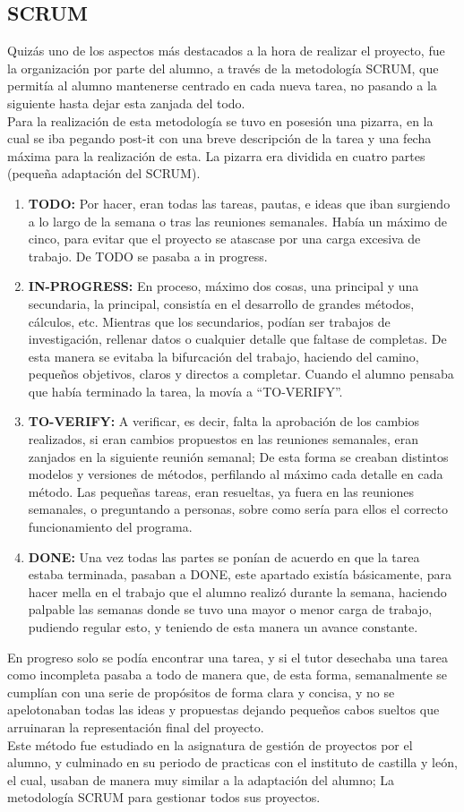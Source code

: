\subsection{SCRUM}
Quizás uno de los aspectos más destacados a la hora de realizar el proyecto, fue la organización por parte del alumno, a través de la metodología SCRUM, que permitía al alumno mantenerse centrado en cada nueva tarea, no pasando a la siguiente hasta dejar esta zanjada del todo. \\
Para la realización de esta metodología se tuvo en posesión una pizarra, en la cual se iba pegando post-it con una breve descripción de la tarea y una fecha máxima para la realización de esta. La pizarra era dividida en cuatro partes (pequeña adaptación del SCRUM).\\
\begin{enumerate}
\item	\textbf{TODO:}  Por hacer, eran todas las tareas, pautas, e ideas que iban surgiendo a lo largo de la semana o tras las reuniones semanales. Había un máximo de cinco, para evitar que el proyecto se atascase por una carga excesiva de trabajo. De TODO se pasaba a in progress. 
\item	\textbf{IN-PROGRESS:} En proceso, máximo dos cosas, una principal y una secundaria, la principal, consistía en el desarrollo de grandes métodos, cálculos, etc. Mientras que los secundarios, podían ser trabajos de investigación, rellenar datos o cualquier detalle que faltase de completas. De esta manera se evitaba la bifurcación del trabajo, haciendo del camino, pequeños objetivos, claros y directos a completar. Cuando el alumno pensaba que había terminado la tarea, la movía a “TO-VERIFY”.
\item	\textbf{TO-VERIFY:} A verificar, es decir, falta la aprobación de los cambios realizados, si eran cambios propuestos en las reuniones semanales, eran zanjados en la siguiente reunión semanal; De esta forma se creaban distintos modelos y versiones de métodos, perfilando al máximo cada detalle en cada método. Las pequeñas tareas, eran resueltas, ya fuera en las reuniones semanales, o preguntando a personas, sobre como sería para ellos el correcto funcionamiento del programa.
\item	\textbf{DONE:} Una vez todas las partes se ponían de acuerdo en que la tarea estaba terminada, pasaban a DONE, este apartado existía básicamente, para hacer mella en el trabajo que el alumno realizó durante la semana, haciendo palpable las semanas donde se tuvo una mayor o menor carga de trabajo, pudiendo regular esto, y teniendo de esta manera un avance constante.
\end{enumerate}
En progreso solo se podía encontrar una tarea, y si el tutor desechaba una tarea como incompleta pasaba a todo de manera que, de esta forma, semanalmente se cumplían con una serie de propósitos de forma clara y concisa, y no se apelotonaban todas las ideas y propuestas dejando pequeños cabos sueltos que arruinaran la representación final del proyecto. \\
Este método fue estudiado en la asignatura de gestión de proyectos por el alumno, y culminado en su periodo de practicas con el instituto de castilla y león, el cual, usaban de manera muy similar a la adaptación del alumno; La metodología SCRUM para gestionar todos sus proyectos.
